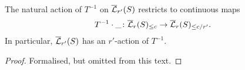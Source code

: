 \begin{lemma}
  \label{Lbar_with_Tinv}
  \leanok
  The natural action of $T^{-1}$ on $\overline{\mathcal L}_{r'}(S)$
  restricts to continuous maps
  \[
    T^{-1} \cdot \_ \colon
    \overline{\mathcal L}_r(S)_{\le c} \to
    \overline{\mathcal L}_r(S)_{\le c/r'}.
  \]
  In particular, $\overline{\mathcal L}_{r'}(S)$
  has an $r'$-action of $T^{-1}$.
\end{lemma}

\begin{proof}
  \leanok
  Formalised, but omitted from this text.
\end{proof}

